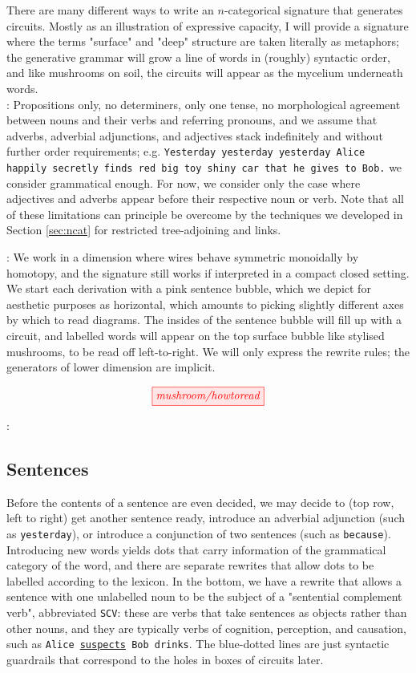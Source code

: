 \begin{fullwidth}
There are many different ways to write an $n$-categorical signature that generates circuits. Mostly as an illustration of expressive capacity, I will provide a signature where the terms "surface" and "deep" structure are taken literally as metaphors; the generative grammar will grow a line of words in (roughly) syntactic order, and like mushrooms on soil, the circuits will appear as the mycelium underneath words.\\

: Propositions only, no determiners, only one tense, no morphological agreement between nouns and their verbs and referring pronouns, and we assume that adverbs, adverbial adjunctions, and adjectives stack indefinitely and without further order requirements; e.g. \texttt{Yesterday yesterday yesterday Alice happily secretly finds red big toy shiny car that he gives to Bob.} we consider grammatical enough. For now, we consider only the case where adjectives and adverbs appear before their respective noun or verb. Note that all of these limitations can principle be overcome by the techniques we developed in Section \ref{sec:ncat} for restricted tree-adjoining and links.

: We work in a dimension where wires behave symmetric monoidally by homotopy, and the signature still works if interpreted in a compact closed setting. We start each derivation with a pink sentence bubble, which we depict for aesthetic purposes as horizontal, which amounts to picking slightly different axes by which to read diagrams. The insides of the sentence bubble will fill up with a circuit, and labelled words will appear on the top surface bubble like stylised mushrooms, to be read off left-to-right. We will only express the rewrite rules; the generators of lower dimension are implicit.

\[
\tikzfig{mushroom/howtoread}
\]

:

\subsection{Sentences}

Before the contents of a sentence are even decided, we may decide to (top row, left to right) get another sentence ready, introduce an adverbial adjunction (such as \texttt{yesterday}), or introduce a conjunction of two sentences (such as \texttt{because}). Introducing new words yields dots that carry information of the grammatical category of the word, and there are separate rewrites that allow dots to be labelled according to the lexicon. In the bottom, we have a rewrite that allows a sentence with one unlabelled noun to be the subject of a "sentential complement verb", abbreviated \texttt{SCV}: these are verbs that take sentences as objects rather than other nouns, and they are typically verbs of cognition, perception, and causation, such as \texttt{Alice \underline{suspects} Bob drinks}. The blue-dotted lines are just syntactic guardrails that correspond to the holes in boxes of circuits later.


\end{fullwidth}
